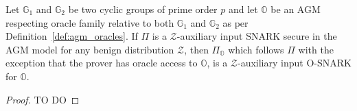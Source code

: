 \begin{corollary}
Let $\mathbb{G}_1$ and  $\mathbb{G}_2$ be two cyclic groups of prime order $p$ and let $\mathbb{O}$ be 
an AGM respecting oracle family relative to both $\mathbb{G}_1$ and $\mathbb{G}_2$ as per Definition~\ref{def:agm_oracles}. 
If $\Pi$ is a $\mathcal{Z}$-auxiliary input SNARK secure in the AGM model for any benign 
distribution $\mathcal{Z}$, then $\Pi_{\mathbb{O}}$ which follows $\Pi$ with the exception that the prover has oracle access 
to $\mathbb{O}$, is a $\mathcal{Z}$-auxiliary input O-SNARK for $\mathbb{O}$. 
\end{corollary}

\begin{proof}{\color{red} TO DO}
\end{proof}

